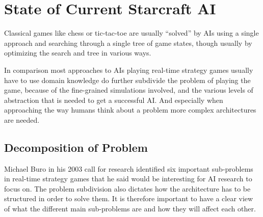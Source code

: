 
\section{State of Current Starcraft AI}
\label{sec:stateofai}

Classical games like chess or tic-tac-toe are usually ``solved'' by AIs using a
single approach and searching through a single tree of game states, though
usually by optimizing the search and tree in various ways.

In comparison most approaches to AIs playing real-time strategy games usually
have to use domain knowledge do further subdivide the problem of playing the
game, because of the fine-grained simulations involved, and the various levels
of abstraction that is needed to get a successful AI. And especially when
approaching the way humans think about a problem more complex architectures
are needed.

\subsection{Decomposition of Problem}
Michael Buro in his 2003 call for research \cite{buro2003real} identified six
important sub-problems in real-time strategy games that he said would be
interesting for AI research to focus on. The problem subdivision also dictates
how the architecture has to be structured in order to solve them. It is
therefore important to have a clear view of what the different main sub-problems
are and how they will affect each other.

